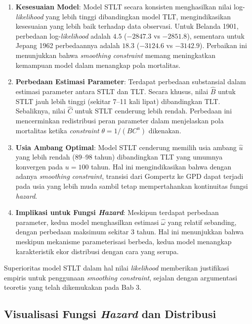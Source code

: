 \begin{enumerate}
    \item \textbf{Kesesuaian Model}: Model STLT secara konsisten menghasilkan nilai log-\textit{likelihood} yang lebih tinggi dibandingkan model TLT, mengindikasikan kesesuaian yang lebih baik terhadap data observasi. Untuk Belanda 1901, perbedaan log-\textit{likelihood} adalah $4.5$ ($-2847.3$ vs $-2851.8$), sementara untuk Jepang 1962 perbedaannya adalah $18.3$ ($-3124.6$ vs $-3142.9$). Perbaikan ini menunjukkan bahwa \textit{smoothing constraint} memang meningkatkan kemampuan model dalam menangkap pola mortalitas.
    
    \item \textbf{Perbedaan Estimasi Parameter}: Terdapat perbedaan substansial dalam estimasi parameter antara STLT dan TLT. Secara khusus, nilai $\hat{B}$ untuk STLT jauh lebih tinggi (sekitar 7--11 kali lipat) dibandingkan TLT. Sebaliknya, nilai $\hat{C}$ untuk STLT cenderung lebih rendah. Perbedaan ini mencerminkan redistribusi peran parameter dalam menjelaskan pola mortalitas ketika \textit{constraint} $\theta = 1/(BC^u)$ dikenakan.
    
    \item \textbf{Usia Ambang Optimal}: Model STLT cenderung memilih usia ambang $\hat{u}$ yang lebih rendah (89--98 tahun) dibandingkan TLT yang umumnya konvergen pada $u = 100$ tahun. Hal ini mengindikasikan bahwa dengan adanya \textit{smoothing constraint}, transisi dari Gompertz ke GPD dapat terjadi pada usia yang lebih muda sambil tetap mempertahankan kontinuitas fungsi \textit{hazard}.
    
    \item \textbf{Implikasi untuk Fungsi \textit{Hazard}}: Meskipun terdapat perbedaan parameter, kedua model menghasilkan estimasi $\hat{\omega}$ yang relatif sebanding, dengan perbedaan maksimum sekitar 3 tahun. Hal ini menunjukkan bahwa meskipun mekanisme parameterisasi berbeda, kedua model menangkap karakteristik ekor distribusi dengan cara yang serupa.
\end{enumerate}

Superioritas model STLT dalam hal nilai \textit{likelihood} memberikan justifikasi empiris untuk penggunaan \textit{smoothing constraint}, sejalan dengan argumentasi teoretis yang telah dikemukakan pada Bab 3.

\subsection{Visualisasi Fungsi \textit{Hazard} dan Distribusi}


